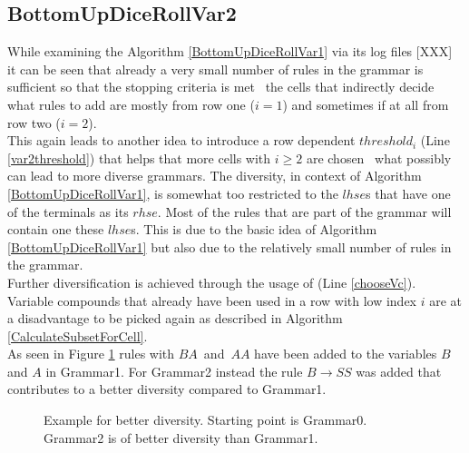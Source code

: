 \subsection{BottomUpDiceRollVar2}
While examining the Algorithm \ref{BottomUpDiceRollVar1} via its log files [XXX] it can be seen that already a very small number of rules in the grammar is sufficient so that the stopping criteria  is met \textendash~the cells that indirectly decide what rules to add are mostly from row one ($i=1$) and sometimes if at all from row two ($i=2$).\\ 
This again leads to another idea to introduce a row dependent $threshold_i$ (Line \ref{var2threshold}) that helps that more cells with $i\geq2$ are chosen \textendash~what possibly can lead to more diverse grammars. The diversity, in context of Algorithm \ref{BottomUpDiceRollVar1}, is somewhat too restricted to the $lhse$s that have one of the terminals as its $rhse$. Most of the rules that are part of the grammar will contain one these $lhse$s. This is due to the basic idea of Algorithm \ref{BottomUpDiceRollVar1} but also due to the relatively small number of rules in the grammar. \\
Further diversification is achieved through the usage of  (Line \ref{chooseVc}). Variable compounds that already have been used in a row with low index $i$ are at a disadvantage to be picked again as described in Algorithm \ref{CalculateSubsetForCell}.\\
As seen in Figure \ref{GoalofBetterDiversity} rules with $BA$~and~$AA$ have been added to the variables $B$ and $A$ in Grammar1. For Grammar2 instead the rule $B\rightarrow SS$ was added that contributes to a better diversity compared to Grammar1.
\noindent
\begin{figure} [h]
	\begin{minipage}{6in}
		\centering
	\end{minipage}
	\caption{Example for better diversity. Starting point is Grammar0. Grammar2 is of better diversity than Grammar1.}
	\label{GoalofBetterDiversity}
\end{figure}


